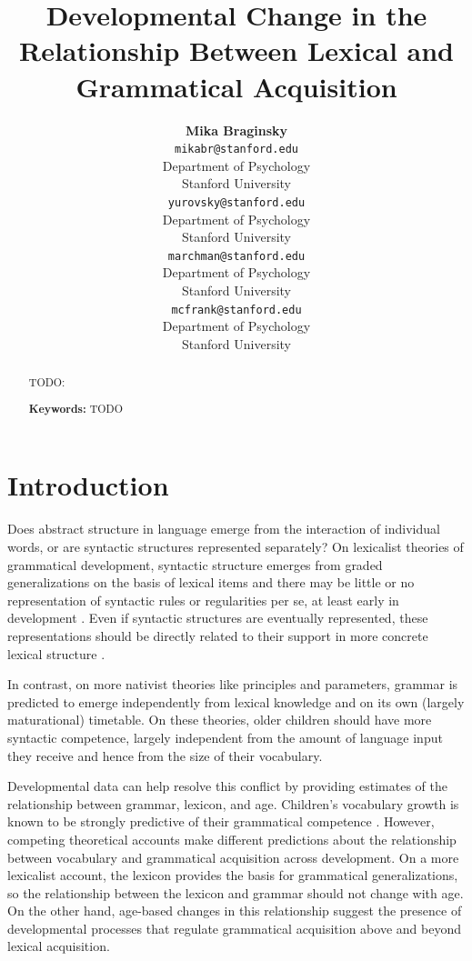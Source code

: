 \documentclass[10pt,letterpaper]{article}
\title{Developmental Change in the Relationship Between Lexical and Grammatical Acquisition}
\author{{\large \bf Mika Braginsky} \\
  \texttt{mikabr@stanford.edu} \\
  Department of Psychology \\
  Stanford University
  \And {\large \bf Daniel Yurovsky} \\
  \texttt{yurovsky@stanford.edu} \\
  Department of Psychology \\
  Stanford University
    \And {\large \bf Virginia Marchman} \\
    \texttt{marchman@stanford.edu} \\
  Department of Psychology \\
  Stanford University
    \And {\large \bf Michael C. Frank}\\
    \texttt{mcfrank@stanford.edu} \\
  Department of Psychology \\
  Stanford University}
\begin{document}
\maketitle

\begin{abstract}
TODO: \lipsum[1]

\textbf{Keywords:} 
TODO
\end{abstract}

\section{Introduction}

Does abstract structure in language emerge from the interaction of individual words, or are syntactic structures represented separately? On lexicalist theories of grammatical development, syntactic structure emerges from graded generalizations on the basis of lexical items and there may be little or no representation of syntactic rules or regularities per se, at least early in development \cite{tomasello2001,tomasello2003}. Even if syntactic structures are eventually represented, these representations should be directly related to their support in more concrete lexical structure \cite{bannard2009,bod2010}.

In contrast, on more nativist theories like principles and parameters, grammar is predicted to emerge independently from lexical knowledge and on its own (largely maturational) timetable. On these theories, older children should have more syntactic competence, largely independent from the amount of language input they receive and hence from the size of their vocabulary.

Developmental data can help resolve this conflict by providing estimates of the relationship between grammar, lexicon, and age. Children's vocabulary growth is known to be strongly predictive of their grammatical competence \cite{bates1997,caselli1999}. However, competing theoretical accounts make different predictions about the relationship between vocabulary and grammatical acquisition across development. On a more lexicalist account, the lexicon provides the basis for grammatical generalizations, so the relationship between the lexicon and grammar should not change with age. On the other hand, age-based changes in this relationship suggest the presence of developmental processes that regulate grammatical acquisition above and beyond lexical acquisition.

\end{document}

